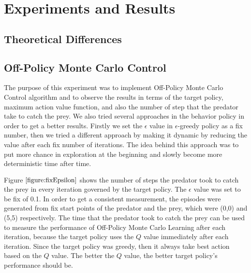 \documentclass[paper=a4, fontsize=11pt]{scrartcl}
\numberwithin{equation}{section}		%
\numberwithin{figure}{section}			%
\numberwithin{table}{section}				%
\begin{document}
\section{Experiments and Results}
\label{results}

\subsection{Theoretical Differences}


\subsection{Off-Policy Monte Carlo Control}
The purpose of this experiment was to implement Off-Policy Monte Carlo Control algorithm and to observe the results in terms of the target policy, maximum action value function, and also the number of step that the predator take to catch the prey. We also tried several approaches in the behavior policy in order to get a better results. Firstly we set the $\epsilon$ value in $\epsilon$-greedy policy as a fix number, then we tried a different approach by making it dynamic by reducing the value after each fix number of iterations. The idea behind this approach was to put more chance in exploration at the beginning and slowly become more deterministic time after time. 

Figure $\ref{figure:fixEpsilon}$ shows the number of steps the predator took to catch the prey in every iteration governed by the target policy. The $\epsilon$ value was set to be fix of 0.1. In order to get a consistent measurement, the episodes were generated from fix start points of the predator and the prey, which were (0,0) and (5,5) respectively. The time that the predator took to catch the prey can be used to measure the performance of Off-Policy Monte Carlo Learning after each iteration, because the target policy uses the $Q$ value immediately after each iteration. Since the target policy was greedy, then it always take best action based on the $Q$ value. The better the $Q$ value, the better target policy's performance should be.
\end{document}
